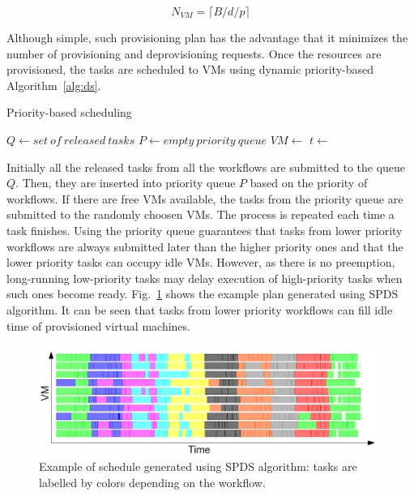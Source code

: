 \documentclass{sig-alternate}
\begin{document}
\begin{equation}
\label{eq:static-plan}
N_{VM} = \lceil B / d / p \rceil
\end{equation}

Although simple, such provisioning plan has the advantage that it
minimizes the number of provisioning and deprovisioning requests.
Once the resources are provisioned, the tasks are scheduled to VMs using dynamic
priority-based Algorithm~\ref{alg:ds}. 

\begin{algorithm}
\caption{Priority-based scheduling}
\label{alg:ds}
\begin{algorithmic}[1]
    \State $Q\gets set\ of\ released\ tasks$
    \State $P\gets empty\ priority\ queue$
    		\State {} 
    	\EndFor
    		\State $VM\gets$ 
    		\State $t\gets$ 
    		\State {}
    	\EndWhile
    	\State {}
    	\State {}
    \EndWhile
\EndProcedure
\end{algorithmic} 
\end{algorithm}

Initially all the
released tasks from all the workflows are submitted to the queue $Q$. Then, they
are inserted into priority queue $P$ based on the priority of workflows. If
there are free VMs available, the tasks from the priority queue are submitted to
the randomly choosen VMs. The process is repeated each time a task finishes.
Using the priority queue guarantees that tasks from lower priority workflows are
always submitted later than the higher priority ones and that the lower priority
tasks can occupy idle VMs. However, as there is no preemption, long-running
low-priority tasks may delay execution of high-priority tasks when such ones
become ready. Fig.~\ref{fig:spds-example} shows the example plan generated using
SPDS algorithm. It can be seen that tasks from lower priority workflows can fill
idle time of provisioned virtual machines.

\begin{figure}[htb] 
\centering
\includegraphics[width=1.0\columnwidth]{figures/spds-gantt}
 \caption{Example of schedule generated using SPDS algorithm: tasks are labelled
 by colors depending on the workflow. }
\label{fig:spds-example}
\end{figure}
\end{document}
